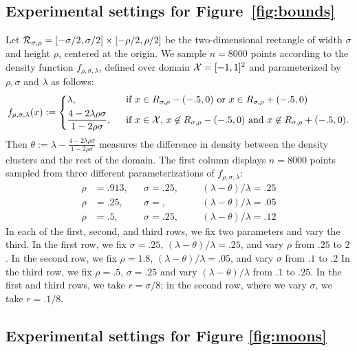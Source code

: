 \subsection{Experimental settings for Figure~\ref{fig:bounds}}
Let $\mathcal{R}_{\sigma,\rho} = [-\sigma/2,\sigma/2] \times [-\rho/2,\rho/2]$ be the two-dimensional rectangle of width $\sigma$ and height $\rho$, centered at the origin. We sample $n = 8000$ points according to the density function $f_{\rho,\sigma,\lambda}$, defined over domain $\mathcal{X} = [-1,1]^2$ and parameterized by $\rho, \sigma$ and $\lambda$ as follows:
\begin{equation}
f_{\rho,\sigma,\lambda}(x) :=
\begin{dcases}
\lambda,~~& \textrm{if $x \in R_{\sigma,\rho} - (-.5,0)$ or $x \in R_{\sigma,\rho} + (-.5,0)$} \\
\frac{4 - 2 \lambda \rho \sigma}{1 - 2\rho\sigma},~~& \textrm{if $x \in \mathcal{X}$, $x \not\in R_{\sigma,\rho} - (-.5,0)$ and $x \not\in R_{\sigma,\rho} + (-.5,0)$.}
\end{dcases}
\end{equation}
Then $\theta := \lambda - \frac{4 - 2 \lambda \rho \sigma}{1 - 2\rho\sigma}$ measures the difference in density between the density clusters and the rest of the domain. The first column displays $n = 8000$ points sampled from three different parameterizations of $f_{\rho,\sigma,\lambda}$:
\begin{align*}
\rho &= .913, &&\sigma = .25, &&&(\lambda - \theta)/\lambda = .25 \tag{top panel} \\
\rho &= .25, &&\sigma = , &&&(\lambda - \theta)/\lambda = .05 \tag{middle panel} \\
\rho &= .5, &&\sigma = .25, &&&(\lambda - \theta)/\lambda = .12 \tag{bottom panel.}
\end{align*}
In each of the first, second, and third rows, we fix two parameters and vary the third. In the first row, we fix $\sigma = .25$, $(\lambda - \theta)/\lambda = .25$, and vary $\rho$ from $.25$ to $2$. In the second row, we fix $\rho = 1.8$, $(\lambda - \theta)/\lambda = .05$, and vary $\sigma$ from $.1$ to $.2$ In the third row, we fix $\rho = .5$, $\sigma = .25$ and vary $(\lambda - \theta)/\lambda$ from $.1$ to $.25$. In the first and third rows, we take $r = \sigma/8$; in the second row, where we vary $\sigma$, we take $r = .1/8$. 

\subsection{Experimental settings for Figure \ref{fig:moons}}

